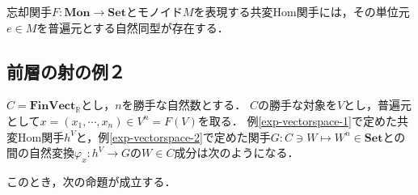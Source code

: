 \documentclass[uplatex, dvipdfmx]{jsreport}
\begin{document}
\begin{screen}
    忘却関手$F:\mathbf{Mon}\to\mathbf{Set}$とモノイド$M$を表現する共変Hom関手には，その単位元$e\in M$を普遍元とする自然同型が存在する．
\end{screen}

\subsection{前層の射の例２}\label{section-vectorspace-base}

$C=\mathbf{FinVect}_\mathbb{R}$とし，$n$を勝手な自然数とする．
$C$の勝手な対象を$V$とし，普遍元として$x=(x_1,\cdots,x_n)\in V^n=F(V)$を取る．
例\ref{exp-vectorspace-1}で定めた共変Hom関手$h^V$と，例\ref{exp-vectorspace-2}で定めた関手$G:C\ni W\mapsto W^n\in\mathbf{Set}$との間の自然変換$\varphi_x:h^V\to G$の$W\in C$成分は次のようになる．
\begin{center}\end{center}
このとき，次の命題が成立する．
\end{document}
